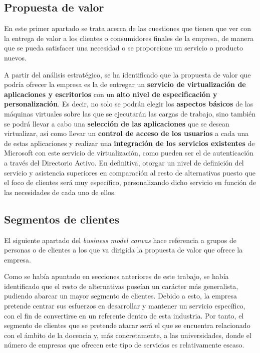 \subsection{Propuesta de valor}
En este primer apartado se trata acerca de las cuestiones que tienen que ver con la entrega de valor a los clientes o consumidores finales de la empresa, de manera que se pueda satisfacer una necesidad o se proporcione un servicio o producto nuevos.

A partir del análisis estratégico, se ha identificado que la propuesta de valor que podría ofrecer la empresa es la de entregar un \textbf{servicio de virtualización de aplicaciones y escritorios} con un \textbf{alto nivel de especificación y personalización}. Es decir, no solo se podrán elegir los \textbf{aspectos básicos} de las máquinas virtuales sobre las que se ejecutarán las cargas de trabajo, sino también se podrá llevar a cabo una \textbf{selección de las aplicaciones} que se desean virtualizar, así como llevar un \textbf{control de acceso de los usuarios} a cada una de estas aplicaciones y realizar una \textbf{integración de los servicios existentes} de Microsoft con este servicio de virtualización, como pueden ser el de autenticación a través del Directorio Activo. En definitiva, otorgar un nivel de definición del servicio y asistencia superiores en comparación al resto de alternativas puesto que el foco de clientes será muy específico, personalizando dicho servicio en función de las necesidades de cada uno de ellos.

\subsection{Segmentos de clientes}
El siguiente apartado del \textit{business model canvas} hace referencia a grupos de personas o de clientes a los que va dirigida la propuesta de valor que ofrece la empresa.

Como se había apuntado en secciones anteriores de este trabajo, se había identificado que el resto de alternativas poseían un carácter más generalista, pudiendo abarcar un mayor segmento de clientes. Debido a esto, la empresa pretende centrar sus esfuerzos en desarrollar y mantener un servicio específico, con el fin de convertirse en un referente dentro de esta industria. Por tanto, el segmento de clientes que se pretende atacar será el que se encuentra relacionado con el ámbito de la docencia y, más concretamente, a las universidades, donde el número de empresas que ofrecen este tipo de servicios es relativamente escaso.

